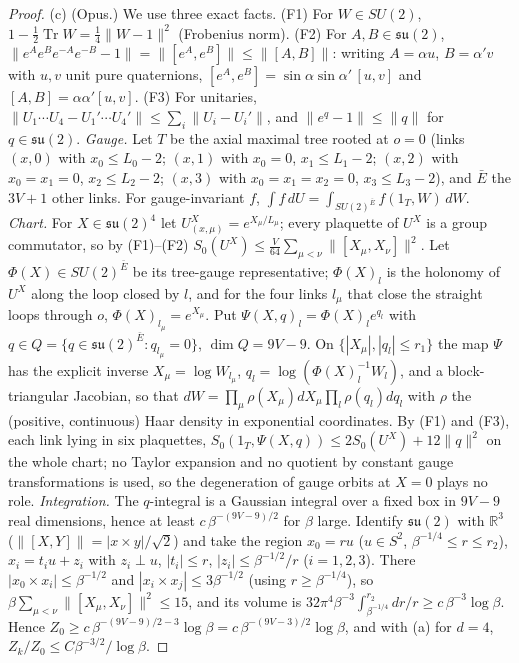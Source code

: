 \documentclass[11pt,a4paper]{article}
\theoremstyle{plain}
\theoremstyle{definition}
\theoremstyle{remark}
\numberwithin{equation}{section}
\newcommand{\R}{\mathbb{R}}
\newcommand{\Tr}{\operatorname{Tr}}
\begin{document}
\begin{proof}
(c) (Opus.) We use three exact facts. (F1) For $W\in SU(2)$, $1-\frac12\Tr W=\frac14\|W-1\|^2$ (Frobenius norm). (F2) For $A,B\in\mathfrak{su}(2)$,
$\|e^Ae^Be^{-A}e^{-B}-1\|=\|[e^A,e^B]\|\le\|[A,B]\|$: writing $A=\alpha u$, $B=\alpha' v$ with $u,v$ unit pure quaternions,
$[e^A,e^B]=\sin\alpha\sin\alpha'\,[u,v]$ and $[A,B]=\alpha\alpha'[u,v]$. (F3) For unitaries, $\|U_1\cdots U_4-U_1'\cdots U_4'\|\le\sum_i\|U_i-U_i'\|$,
and $\|e^q-1\|\le\|q\|$ for $q\in\mathfrak{su}(2)$.
\emph{Gauge.} Let $T$ be the axial maximal tree rooted at $o=0$ (links $(x,0)$ with $x_0\le L_0-2$; $(x,1)$ with $x_0=0$, $x_1\le L_1-2$;
$(x,2)$ with $x_0=x_1=0$, $x_2\le L_2-2$; $(x,3)$ with $x_0=x_1=x_2=0$, $x_3\le L_3-2$), and $\bar E$ the $3V+1$ other links. For gauge-invariant
$f$, $\int f\,dU=\int_{SU(2)^{\bar E}}f(1_T,W)\,dW$.
\emph{Chart.} For $X\in\mathfrak{su}(2)^4$ let $U^X_{(x,\mu)}=e^{X_\mu/L_\mu}$; every plaquette of $U^X$ is a group commutator, so by (F1)--(F2)
$S_0(U^X)\le\frac V{64}\sum_{\mu<\nu}\|[X_\mu,X_\nu]\|^2$. Let $\Phi(X)\in SU(2)^{\bar E}$ be its tree-gauge representative; $\Phi(X)_l$ is the
holonomy of $U^X$ along the loop closed by $l$, and for the four links $l_\mu$ that close the straight loops through $o$, $\Phi(X)_{l_\mu}=e^{X_\mu}$.
Put $\Psi(X,q)_l=\Phi(X)_le^{q_l}$ with $q\in Q=\{q\in\mathfrak{su}(2)^{\bar E}:q_{l_\mu}=0\}$, $\dim Q=9V-9$. On $\{|X_\mu|,|q_l|\le r_1\}$
the map $\Psi$ has the explicit inverse $X_\mu=\log W_{l_\mu}$, $q_l=\log(\Phi(X)_l^{-1}W_l)$, and a block-triangular Jacobian, so that
$dW=\prod_\mu\rho(X_\mu)dX_\mu\prod_l\rho(q_l)dq_l$ with $\rho$ the (positive, continuous) Haar density in exponential coordinates.
By (F1) and (F3), each link lying in six plaquettes, $S_0(1_T,\Psi(X,q))\le2S_0(U^X)+12\|q\|^2$ on the whole chart; no Taylor expansion and
no quotient by constant gauge transformations is used, so the degeneration of gauge orbits at $X=0$ plays no role.
\emph{Integration.} The $q$-integral is a Gaussian integral over a fixed box in $9V-9$ real dimensions, hence at least $c\,\beta^{-(9V-9)/2}$ for $\beta$ large. Identify $\mathfrak{su}(2)$ with $\R^3$
($\|[X,Y]\|=|x\times y|/\sqrt2$) and take the region $x_0=ru$ ($u\in S^2$, $\beta^{-1/4}\le r\le r_2$), $x_i=t_iu+z_i$ with $z_i\perp u$,
$|t_i|\le r$, $|z_i|\le\beta^{-1/2}/r$ ($i=1,2,3$). There $|x_0\times x_i|\le\beta^{-1/2}$ and $|x_i\times x_j|\le3\beta^{-1/2}$ (using $r\ge\beta^{-1/4}$),
so $\beta\sum_{\mu<\nu}\|[X_\mu,X_\nu]\|^2\le15$, and its volume is $32\pi^4\beta^{-3}\int_{\beta^{-1/4}}^{r_2}dr/r\ge c\,\beta^{-3}\log\beta$.
Hence $Z_0\ge c\,\beta^{-(9V-9)/2-3}\log\beta=c\,\beta^{-(9V-3)/2}\log\beta$, and with (a) for $d=4$, $Z_k/Z_0\le C\beta^{-3/2}/\log\beta$.
\end{proof}
\end{document}
